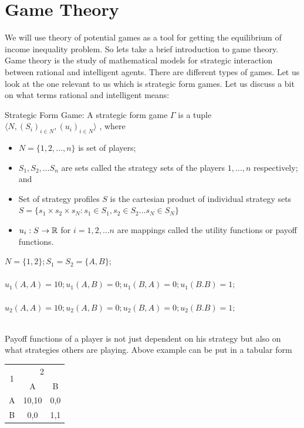 \documentclass[letterpaper,english,10pt]{article}
\begin{document}
\section{Game Theory}
We will use theory of potential games as a tool for getting the equilibrium of income inequality problem. So lets take a brief introduction to game theory. \\
Game theory is the study of mathematical models for strategic interaction between rational and intelligent agents. There are different types of games. Let us look at the one relevant to us which is strategic form games. Let us discuss a bit on what terms rational and intelligent means:

\begin{defn}
Strategic Form Game: A strategic form game $\Gamma$ is a tuple $\langle N, (S_i)_{i\in N}, (u_i)_{i \in N} \rangle$ , where 
\begin{itemize}
\item $N = \lbrace 1,2,\dots ,n\rbrace$ is set of players;
\item $S_1,S_2,\dots S_n$ are sets called the strategy sets of the players $1,\dots , n$ respectively; and
\item Set of strategy profiles $S$ is the cartesian product of individual strategy sets $S=\lbrace s_1 \times s_2 \times s_N : s_1\in S_1, s_2 \in S_2 \dots s_N \in S_N  \rbrace $
\item $u_i  : S \rightarrow \mathbb{R}$ for $i=1,2,\dots n$ are mappings called the utility functions or payoff functions.

\end{itemize}
 \end{defn}
\begin{exmp}
$ N=\lbrace 1,2 \rbrace ;S_1= S_2 = \lbrace A,B \rbrace ;$ \\ \\
$u_1(A,A) = 10; u_1(A,B)=0; u_1(B,A) = 0 ; u_1(B.B) = 1;$ \\ \\
$u_2(A,A) = 10; u_2(A,B)=0; u_2(B,A) = 0 ; u_2(B.B) = 1;$ \\ \\
\end{exmp}
Payoff functions of a player is not just dependent on his strategy but also on what strategies others are playing.
Above example can be put in a tabular form

\begin{table}[ht]
\begin{center}
\begin{tabular}{|c|c|c|}
\hline
\multirow{2}{*}{1} & \multicolumn{2}{c|}{2} \\ \cline{2-3} 
                   & A           & B        \\ \hline
A                  & 10,10       & 0,0      \\ \hline
B                  & 0,0         & 1,1      \\ \hline
\end{tabular}
\end{center}
\end{table}
\end{document}
